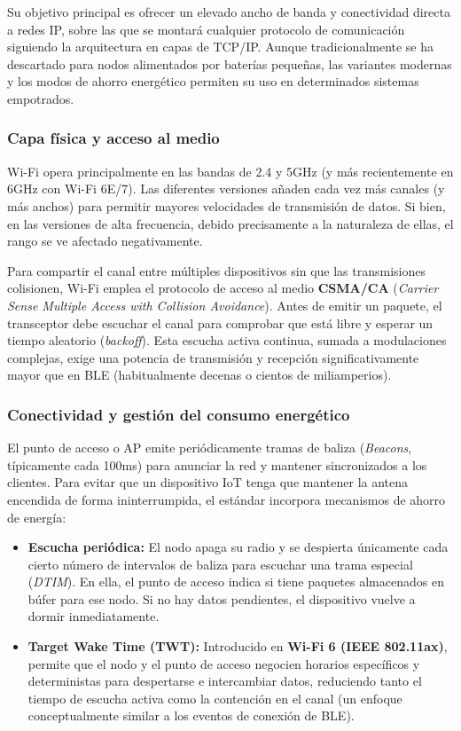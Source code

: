 \documentclass[../main.tex]{subfiles}
\begin{document}
            Su objetivo principal es ofrecer un elevado ancho de banda y conectividad directa a redes IP, sobre las que se montará cualquier protocolo de comunicación siguiendo la arquitectura en capas de TCP/IP. Aunque tradicionalmente se ha descartado para nodos alimentados por baterías pequeñas, las variantes modernas y los modos de ahorro energético permiten su uso en determinados sistemas empotrados.

            \subsubsection{Capa física y acceso al medio}
                Wi-Fi opera principalmente en las bandas de 2.4 y 5GHz (y más recientemente en 6GHz con Wi-Fi 6E/7). Las diferentes versiones añaden cada vez más canales (y más anchos) para permitir mayores velocidades de transmisión de datos. Si bien, en las versiones de alta frecuencia, debido precisamente a la naturaleza de ellas, el rango se ve afectado negativamente.

                Para compartir el canal entre múltiples dispositivos sin que las transmisiones colisionen, Wi-Fi emplea el protocolo de acceso al medio \textbf{CSMA/CA} (\emph{Carrier Sense Multiple Access with Collision Avoidance}). Antes de emitir un paquete, el transceptor debe escuchar el canal para comprobar que está libre y esperar un tiempo aleatorio (\emph{backoff}). Esta escucha activa continua, sumada a modulaciones complejas, exige una potencia de transmisión y recepción significativamente mayor que en BLE (habitualmente decenas o cientos de miliamperios).

            \subsubsection{Conectividad y gestión del consumo energético}
                El punto de acceso o AP emite periódicamente tramas de baliza (\emph{Beacons}, típicamente cada 100ms) para anunciar la red y mantener sincronizados a los clientes. Para evitar que un dispositivo IoT tenga que mantener la antena encendida de forma ininterrumpida, el estándar incorpora mecanismos de ahorro de energía:

                \begin{itemize}
                    \item \textbf{Escucha periódica:} El nodo apaga su radio y se despierta únicamente cada cierto número de intervalos de baliza para escuchar una trama especial (\emph{DTIM}). En ella, el punto de acceso indica si tiene paquetes almacenados en búfer para ese nodo. Si no hay datos pendientes, el dispositivo vuelve a dormir inmediatamente.
                    \item \textbf{Target Wake Time (TWT):} Introducido en \textbf{Wi-Fi 6 (IEEE 802.11ax)}, permite que el nodo y el punto de acceso negocien horarios específicos y deterministas para despertarse e intercambiar datos, reduciendo tanto el tiempo de escucha activa como la contención en el canal (un enfoque conceptualmente similar a los eventos de conexión de BLE).
                \end{itemize}
\end{document}
